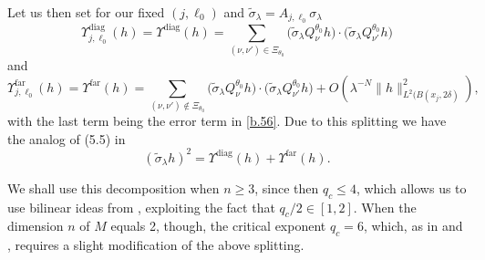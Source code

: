 \documentclass[10pt]{amsart}
\newcommand{\la}{\lambda}
\newcommand{\1}{{\bf 1}}
\newcommand{\diag}{\Upsilon^{\text{diag}}}
\newcommand{\far}{\Upsilon^{\text{far}}}
\begin{document}
Let us then set  for our fixed $(j,\ell_0)$ and  $\tilde \sigma_\la =A_{j,\ell_0}\sigma_\la$
\begin{equation}\label{b.58}
\diag_{j,\ell_0}(h)=\diag(h)=\sum_{(\nu, \nu')\in \Xi_{\theta_0}} 
\bigl( \tilde \sigma_\la Q^{\theta_0}_\nu h\bigr) 
\cdot \bigl( \tilde \sigma_\la
Q^{\theta_0}_{ \nu'} 
h\bigr)
\end{equation}
and
\begin{equation}\label{b.59}
\far_{j,\ell_0}(h)=
\far(h)=\sum_{(\nu, \nu')\notin \Xi_{\theta_0}} 
\bigl( \tilde \sigma_\la Q^{\theta_0}_\nu h\bigr) 
\cdot \bigl( \tilde \sigma_\la
Q^{\theta_0}_{ \nu'} 
h\bigr)+O(\la^{-N}\|h\|^2_{L^2(B(x_j,2\delta)}),
\end{equation}
with the last term being the error term in \eqref{b.56}.
Due to this splitting we have
the analog of (5.5) in \cite{HSp}
\begin{equation}\label{b.60}
(\tilde \sigma_\la h)^2 = \diag(h) +\far(h).
\end{equation}


We shall use this decomposition when $n\ge3$, since then $q_c\le 4$, which allows us to use bilinear ideas
from \cite{TaoVargasVega}, exploiting the fact that $q_c/2\in [1,2]$.
When the dimension $n$ of $M$ equals 2, though, the critical exponent $q_c=6$, which, as in \cite{BHSsp} and \cite{HSp},
 requires a slight modification of the above splitting.  
\end{document}
